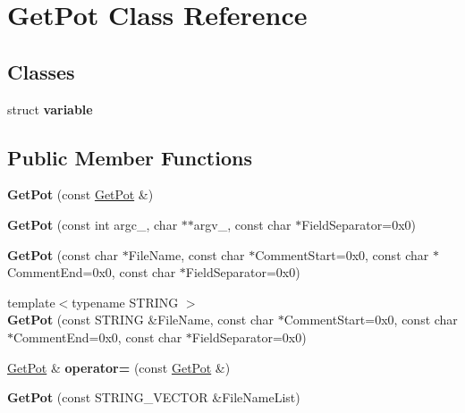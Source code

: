 \hypertarget{classGetPot}{
\section{GetPot Class Reference}
\label{classGetPot}
}
\subsection*{Classes}
\begin{DoxyCompactItemize}
\item 
struct {\bfseries variable}
\end{DoxyCompactItemize}
\subsection*{Public Member Functions}
\begin{DoxyCompactItemize}
\item 
\hypertarget{classGetPot_ac36175020c34fa0b29dcadda76f6926e}{
{\bfseries GetPot} (const \hyperlink{classGetPot}{GetPot} \&)}
\label{classGetPot_ac36175020c34fa0b29dcadda76f6926e}

\item 
\hypertarget{classGetPot_a75bfaf47037a4794d02a7b48befa3ecf}{
{\bfseries GetPot} (const int argc\_\-, char $\ast$$\ast$argv\_\-, const char $\ast$FieldSeparator=0x0)}
\label{classGetPot_a75bfaf47037a4794d02a7b48befa3ecf}

\item 
\hypertarget{classGetPot_a076ce92a05d0dfe45e1982102d6b4526}{
{\bfseries GetPot} (const char $\ast$FileName, const char $\ast$CommentStart=0x0, const char $\ast$CommentEnd=0x0, const char $\ast$FieldSeparator=0x0)}
\label{classGetPot_a076ce92a05d0dfe45e1982102d6b4526}

\item 
\hypertarget{classGetPot_ac55964791c1b7ac69c8c955022539873}{
{\footnotesize template$<$typename STRING $>$ }\\{\bfseries GetPot} (const STRING \&FileName, const char $\ast$CommentStart=0x0, const char $\ast$CommentEnd=0x0, const char $\ast$FieldSeparator=0x0)}
\label{classGetPot_ac55964791c1b7ac69c8c955022539873}

\item 
\hypertarget{classGetPot_a92c9fa06ffb4b578cdbb6e9200d27249}{
\hyperlink{classGetPot}{GetPot} \& {\bfseries operator=} (const \hyperlink{classGetPot}{GetPot} \&)}
\label{classGetPot_a92c9fa06ffb4b578cdbb6e9200d27249}

\item 
\hypertarget{classGetPot_a22bb4a0e853fb40b19293f5604341a6c}{
{\bfseries GetPot} (const STRING\_\-VECTOR \&FileNameList)}
\label{classGetPot_a22bb4a0e853fb40b19293f5604341a6c}


\end{DoxyCompactItemize}
